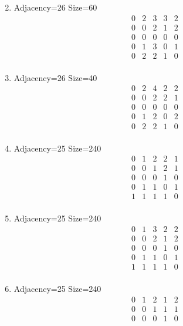 \documentclass[12pt]{article}
\begin{document}
\begin{multicols}{3}
\begin{enumerate}
\begin{equation*}
\end{equation*}
\item Adjacency=26 Size=60
\begin{equation*}
\begin{array}{ccccc}
0&2&3&3&2\\
0&0&2&1&2\\
0&0&0&0&0\\
0&1&3&0&1\\
0&2&2&1&0\\
\end{array}
\end{equation*}
\item Adjacency=26 Size=40
\begin{equation*}
\begin{array}{ccccc}
0&2&4&2&2\\
0&0&2&2&1\\
0&0&0&0&0\\
0&1&2&0&2\\
0&2&2&1&0\\
\end{array}
\end{equation*}
\item Adjacency=25 Size=240
\begin{equation*}
\begin{array}{ccccc}
0&1&2&2&1\\
0&0&1&2&1\\
0&0&0&1&0\\
0&1&1&0&1\\
1&1&1&1&0\\
\end{array}
\end{equation*}
\item Adjacency=25 Size=240
\begin{equation*}
\begin{array}{ccccc}
0&1&3&2&2\\
0&0&2&1&2\\
0&0&0&1&0\\
0&1&1&0&1\\
1&1&1&1&0\\
\end{array}
\end{equation*}
\item Adjacency=25 Size=240
\begin{equation*}
\begin{array}{ccccc}
0&1&2&1&2\\
0&0&1&1&1\\
0&0&0&1&0\\

\end{array}
\end{equation*}
\end{enumerate}
\end{multicols}
\end{document}
